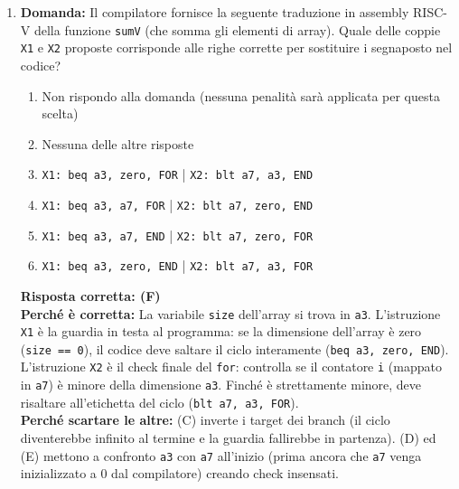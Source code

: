 \documentclass[12pt, a4paper]{article}
\begin{document}
\begin{enumerate}
    \item \textbf{Domanda:} Il compilatore fornisce la seguente traduzione in assembly RISC-V della funzione \texttt{sumV} (che somma gli elementi di array). Quale delle coppie \texttt{X1} e \texttt{X2} proposte corrisponde alle righe corrette per sostituire i segnaposto nel codice?
    \begin{enumerate}[label=(\Alph*)]
        \item Non rispondo alla domanda (nessuna penalità sarà applicata per questa scelta)
        \item Nessuna delle altre risposte
        \item \texttt{X1: beq a3, zero, FOR} | \texttt{X2: blt a7, a3, END}
        \item \texttt{X1: beq a3, a7, FOR} | \texttt{X2: blt a7, zero, END}
        \item \texttt{X1: beq a3, a7, END} | \texttt{X2: blt a7, zero, FOR}
        \item \texttt{X1: beq a3, zero, END} | \texttt{X2: blt a7, a3, FOR}
    \end{enumerate}
    \textbf{Risposta corretta: (F)} \\
    \textbf{Perché è corretta:} La variabile \texttt{size} dell'array si trova in \texttt{a3}. L'istruzione \texttt{X1} è la guardia in testa al programma: se la dimensione dell'array è zero (\texttt{size == 0}), il codice deve saltare il ciclo interamente (\texttt{beq a3, zero, END}). L'istruzione \texttt{X2} è il check finale del \texttt{for}: controlla se il contatore \texttt{i} (mappato in \texttt{a7}) è minore della dimensione \texttt{a3}. Finché è strettamente minore, deve risaltare all'etichetta del ciclo (\texttt{blt a7, a3, FOR}). \\
    \textbf{Perché scartare le altre:} (C) inverte i target dei branch (il ciclo diventerebbe infinito al termine e la guardia fallirebbe in partenza). (D) ed (E) mettono a confronto \texttt{a3} con \texttt{a7} all'inizio (prima ancora che \texttt{a7} venga inizializzato a 0 dal compilatore) creando check insensati.

\end{enumerate}
\end{document}
